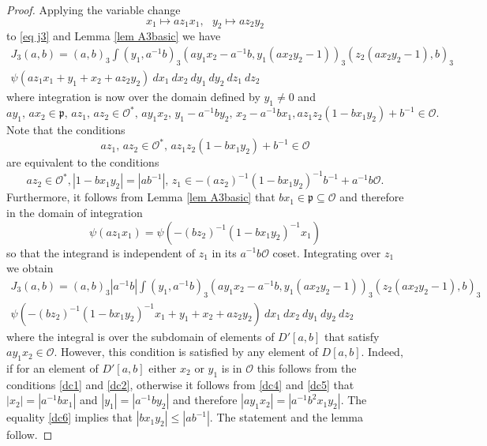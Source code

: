 \documentclass[12pt]{amsart}
\newcommand{\abs}[1]{\left|{#1}\right|}
\newcommand{\p}{\mathfrak{p}}
\renewcommand{\O}{\mathcal{O}}
\theoremstyle{remark}
\begin{document}
\begin{proof}
Applying the variable change
\[
x_1\mapsto az_1x_1, \ \ \ y_2\mapsto az_2 y_2
\]
to \eqref{eq j3} and Lemma \ref{lem A3basic}  we have
\begin{multline*}
J_3(a,b)=(a,b)_3\int  (y_1,a^{-1}b)_3(ay_1x_2-a^{-1}b,y_1(ax_2y_2-1))_3(z_2(ax_2y_2-1),b)_3  \\ \psi(a z_1x_1+y_1+x_2+az_2y_2)\ dx_1\ dx_2\ dy_1\ dy_2\ dz_1\ dz_2
\end{multline*}
where integration is now over the domain defined by $y_1\ne 0$ and 
\[
ay_1,\,ax_2\in \p,\, az_1,\,az_2\in \O^*,\,ay_1x_2,\, y_1-a^{-1}by_2,\,x_2-a^{-1}bx_1, az_1z_2(1-bx_1y_2)+b^{-1}\in \O.
\]
Note that the conditions 
\[
az_1,\,az_2\in \O^*,\, az_1z_2(1-bx_1y_2)+b^{-1}\in \O
\] 
are equivalent to the conditions
\[
az_2\in \O^*,\abs{1-bx_1y_2}=\abs{ab^{-1}},\, z_1\in -(az_2)^{-1}(1-bx_1y_2)^{-1}b^{-1}+a^{-1}b\O.
\]
Furthermore, it follows from Lemma \ref{lem A3basic} that $bx_1\in \p\subseteq \O$ and therefore in the domain of integration
\[
\psi(a z_1x_1)=\psi(-(b z_2)^{-1}(1-bx_1y_2)^{-1}x_1)
\]
so that the integrand is independent of $z_1$ in its $a^{-1}b\O$ coset. Integrating over $z_1$ we obtain
\begin{multline*}
J_3(a,b)=(a,b)_3\abs{a^{-1}b}\int (y_1,a^{-1}b)_3(ay_1x_2-a^{-1}b,y_1(ax_2y_2-1))_3(z_2(ax_2y_2-1),b)_3  \\ \psi(-(b z_2)^{-1}(1-bx_1y_2)^{-1}x_1+y_1+x_2+az_2y_2)\ dx_1\ dx_2\ dy_1\ dy_2\ dz_2
\end{multline*}
where the integral is over the subdomain of elements of $D'[a,b]$ that satisfy $ay_1x_2\in \O$. However, this condition is satisfied by any element of $D[a,b]$. Indeed, if for an element of $D'[a,b]$ either $x_2$ or $y_1$ is in $\O$ this follows from the conditions \ref{dc1} and \ref{dc2}, otherwise it follows from \ref{dc4} and \ref{dc5} that $\abs{x_2}=\abs{a^{-1}bx_1}$ and $\abs{y_1}=\abs{a^{-1}by_2}$ and therefore $\abs{ay_1x_2}=\abs{a^{-1}b^2x_1y_2}$. The equality \ref{dc6} implies that $\abs{bx_1y_2}\le \abs{ab^{-1}}$. The statement and the lemma follow.  
\end{proof}
\end{document}
